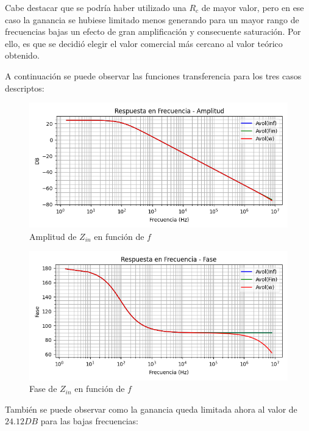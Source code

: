 Cabe destacar que se podría haber utilizado una $R_c$ de mayor valor, pero en ese caso la ganancia se hubiese limitado menos generando para un mayor rango de frecuencias bajas
un efecto de gran amplificación y consecuente saturación. Por ello, es que se decidió elegir el valor comercial más cercano al valor teórico obtenido.

A continuación se puede observar las funciones transferencia para los tres casos descriptos:

\begin{figure}[H]
    \centering 
    \includegraphics [scale=1] {../Ejercicio3-CircuitoIntegradoresyDerivadores/Imagenes/diagrama-bode-integrador-compensado-amplitud.png} 
    \caption{Amplitud de $Z_{in}$ en función de $f$}
    \label{fig:emptyPlotTool}
\end{figure}

\begin{figure}[H]
    \centering 
    \includegraphics [scale=1] {../Ejercicio3-CircuitoIntegradoresyDerivadores/Imagenes/diagrama-bode-integrador-compensado-fase.png} 
    \caption{Fase de $Z_{in}$ en función de $f$ }
    \label{fig:emptyPlotTool}
\end{figure}

También se puede observar como la ganancia queda limitada ahora al valor de $24.12DB$ para las bajas frecuencias:

